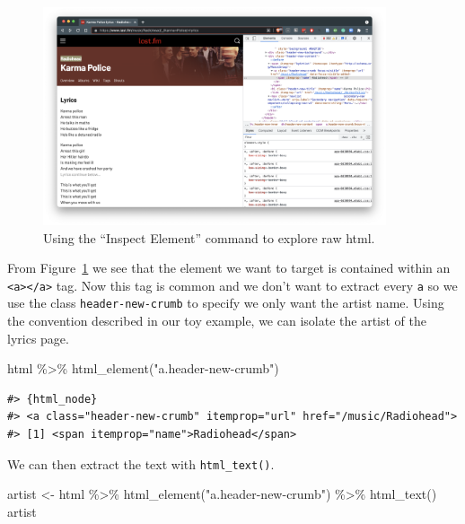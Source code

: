 \documentclass[
  letterpaper,
]{latex/krantz}
\newenvironment{Shaded}{\begin{snugshade}}{\end{snugshade}}
\newcommand{\FunctionTok}[1]{\textcolor[rgb]{0.28,0.35,0.67}{#1}}
\newcommand{\NormalTok}[1]{\textcolor[rgb]{0.00,0.23,0.31}{#1}}
\newcommand{\OtherTok}[1]{\textcolor[rgb]{0.00,0.23,0.31}{#1}}
\newcommand{\SpecialCharTok}[1]{\textcolor[rgb]{0.37,0.37,0.37}{#1}}
\newcommand{\StringTok}[1]{\textcolor[rgb]{0.13,0.47,0.30}{#1}}
\begin{document}
\begin{figure}

{\centering \includegraphics[width=0.9\textwidth,height=\textheight]{./figures/acquire-data/ad-lastfm-artist-inspect.png}

}

\caption{\label{fig-ad-inspect-element-artist-lastfm}Using the ``Inspect
Element'' command to explore raw html.}

\end{figure}

From Figure~\ref{fig-ad-inspect-element-artist-lastfm} we see that the
element we want to target is contained within an
\texttt{\textless{}a\textgreater{}\textless{}/a\textgreater{}} tag. Now
this tag is common and we don't want to extract every \texttt{a} so we
use the class \texttt{header-new-crumb} to specify we only want the
artist name. Using the convention described in our toy example, we can
isolate the artist of the lyrics page.

\begin{Shaded}
\begin{Highlighting}[]
\NormalTok{html }\SpecialCharTok{\%\textgreater{}\%} 
  \FunctionTok{html\_element}\NormalTok{(}\StringTok{"a.header{-}new{-}crumb"}\NormalTok{)}
\end{Highlighting}
\end{Shaded}

\begin{verbatim}
#> {html_node}
#> <a class="header-new-crumb" itemprop="url" href="/music/Radiohead">
#> [1] <span itemprop="name">Radiohead</span>
\end{verbatim}

We can then extract the text with \texttt{html\_text()}.

\begin{Shaded}
\begin{Highlighting}[]
\NormalTok{artist }\OtherTok{\textless{}{-}} 
\NormalTok{  html }\SpecialCharTok{\%\textgreater{}\%} 
  \FunctionTok{html\_element}\NormalTok{(}\StringTok{"a.header{-}new{-}crumb"}\NormalTok{) }\SpecialCharTok{\%\textgreater{}\%} 
  \FunctionTok{html\_text}\NormalTok{()}
\NormalTok{artist}
\end{Highlighting}
\end{Shaded}
\end{document}

